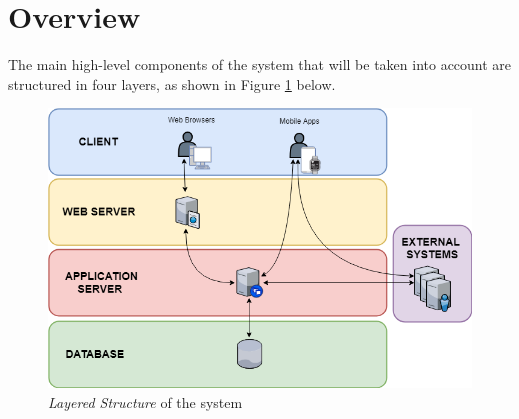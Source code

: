  \section{Overview}
The main high-level components of the system that will be taken into account are structured in four layers, as shown in Figure \ref{img:layeredStructure} below.

\begin{figure}[H]
  \begin{center}
  	\includegraphics[width=\textwidth]{./img/LayeredStructure.png}
    \hspace{0.05\linewidth}
    \centering
    \caption{\textit{Layered Structure} of the system}
		\label{img:layeredStructure}
    \end{center}
\end{figure}

